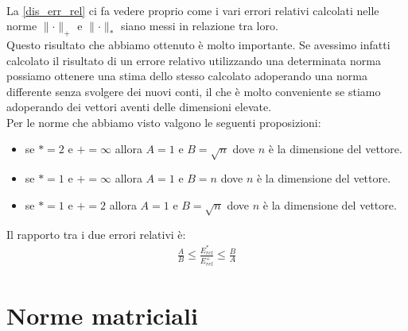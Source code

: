 \documentclass[12pt, a4paper]{book}
\theoremstyle{definition}
\begin{document}
\begin{flushleft}
\begin{equation}
\begin{split}
	\end{split}
\end{equation}
La \ref{dis_err_rel} ci fa vedere proprio come i vari errori relativi calcolati nelle norme $\lVert \cdot \rVert_{+}$ e $\lVert \cdot \rVert_{*}$ siano messi in relazione tra loro. \\
Questo risultato che abbiamo ottenuto è molto importante. Se avessimo infatti calcolato il risultato di un errore relativo utilizzando una determinata norma possiamo ottenere una stima dello stesso calcolato adoperando una norma differente senza svolgere dei nuovi conti, il che è molto conveniente se stiamo adoperando dei vettori aventi delle dimensioni elevate.\\
 
Per le norme che abbiamo visto valgono le seguenti proposizioni:  
\begin{itemize}
	\item se $*= 2$ e $+ = \infty$ allora $A=1$ e $B=\sqrt{n}$ dove $n$ è la dimensione del vettore.
	\item se $*= 1$ e $+ = \infty$ allora $A=1$ e $B=n$ dove $n$ è la dimensione del vettore.
	\item se $*= 1$ e $+ = 2$ allora $A=1$ e $B=\sqrt{n}$ dove $n$ è la dimensione del vettore.
\end{itemize}

Il rapporto tra i due errori relativi è:
\begin{equation} \label{dis_err_rel_1}
	\begin{split}
		\frac{A}{B} \leq \frac{E_{rel}^{*}}{E_{rel}^{
		+}} \leq \frac{B}{A}
	\end{split}
\end{equation}
\end{flushleft}
\newpage

\section{Norme matriciali}
\end{document}
